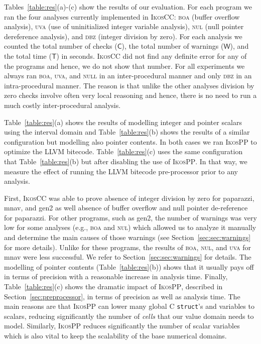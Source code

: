 \documentclass[a4]{article}
\newcommand{\ikoscc}{\textsc{IkosCC}\xspace}
\newcommand{\ikospp}{\textsc{IkosPP}\xspace}
\begin{document}
Tables~\ref{table:res}(a)-(c) show the results of our evaluation. For each
program we ran the four analyses currently implemented in \ikoscc:
\textsc{boa} (buffer overflow analysis), \textsc{uva} (use of
uninitialized integer variable analysis), \textsc{nul} (null pointer
dereference analysis), and \textsc{dbz} (integer division by zero).
%
For each analysis we counted the total number of checks ($\mathsf{C}$),
the total number of warnings ($\mathsf{W}$), and the total time
($\mathsf{T}$) in seconds. \ikoscc did not find any definite error for
any of the programs and hence, we do not show that number.
%
For all experiments we always ran \textsc{boa}, \textsc{uva}, and
\textsc{null} in an inter-procedural manner and only \textsc{dbz} in
an intra-procedural manner. The reason is that unlike the other
analyses division by zero checks involve often very local reasoning
and hence, there is no need to run a much costly inter-procedural
analysis. 

Table~\ref{table:res}(a) shows the results of modelling integer and
pointer scalars using the interval domain and Table~\ref{table:res}(b)
shows the results of a similar configuration but modelling also
pointer contents. In both cases we ran \ikospp to optimize the LLVM
bitecode. Table~\ref{table:res}(c) uses the same configuration that
Table~\ref{table:res}(b) but after disabling the use of \ikospp. In
that way, we measure the effect of running the LLVM bitecode
pre-processor prior to any analysis.

First, \ikoscc was able to prove absence of integer division by zero
for \textsf{paparazzi}, \textsf{mnav}, and \textsf{gen2} as well
absence of buffer overflow and null pointer de-reference for
\textsf{paparazzi}. For other programs, such as \textsf{gen2}, the
number of warnings was very low for some analyses (e.g., \textsc{boa}
and \textsc{nul}) which allowed us to analyze it manually and
determine the main causes of those warnings (see
Section~\ref{sec:sec:warnings} for more details). 
%
Unlike for these programs, the results of \textsc{boa}, \textsc{nul},
and \textsc{uva} for \textsf{mnav} were less successful. We refer to
Section~\ref{sec:sec:warnings} for details.
%
The modelling of pointer contents (Table~\ref{table:res}(b)) shows
that it usually pays off in terms of precision with a reasonable
increase in analysis time. %
%
Finally, Table~\ref{table:res}(c) shows the dramatic impact of
\ikospp, described in Section~\ref{sec:preprocessor}, in terms of
precision as well as analysis time. The main reasons are that \ikospp
can lower many global C \texttt{struct}'s and variables to scalars,
reducing significantly the number of \emph{cells} that our value
domain needs to model. Similarly, \ikospp reduces significantly the
number of scalar variables which is also vital to keep the scalability
of the base numerical domains.
\end{document}
